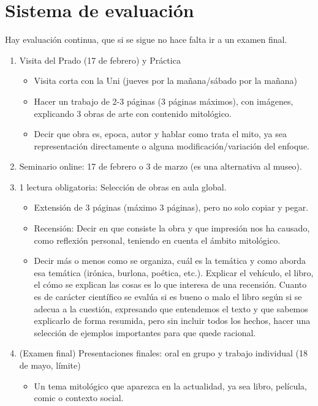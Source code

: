 \section{Sistema de evaluación}\label{sec:sistema-de-evaluación}
Hay evaluación continua, que si se sigue no hace falta ir a un examen final.
\begin{enumerate}
	\item Visita del Prado (17 de febrero) y Práctica
	      \begin{itemize}
		      \item Visita corta con la Uni (jueves por la mañana/sábado por la mañana)
		      \item Hacer un trabajo de 2-3 páginas (3 páginas máximos), con imágenes, explicando 3 obras de arte con contenido mitológico.
		      \item Decir que obra es, epoca, autor y hablar como trata el mito, ya sea representación directamente o alguna modificación/variación del enfoque.
	      \end{itemize}
	\item Seminario online: 17 de febrero o 3 de marzo (es una alternativa al museo).
	\item 1 lectura obligatoria: Selección de obras en aula global.
	      \begin{itemize}
		      \item Extensión de 3 páginas (máximo 3 páginas), pero no solo copiar y pegar.
		      \item Recensión: Decir en que consiste la obra y que impresión nos ha causado, como reflexión personal, teniendo en cuenta el ámbito mitológico.
		      \item Decir más o menos como se organiza, cuál es la temática y como aborda esa temática (irónica, burlona, poética, etc.). Explicar el vehículo, el libro, el cómo se explican las cosas es lo que interesa de una recensión. Cuanto es de carácter científico se evalúa si es bueno o malo el libro según si se adecua a la cuestión, expresando que entendemos el texto y que sabemos explicarlo de forma resumida, pero sin incluir todos los hechos, hacer una selección de ejemplos importantes para que quede racional.
	      \end{itemize}
	\item (Examen final) Presentaciones finales: oral en grupo y trabajo individual (18 de mayo, límite)
	      \begin{itemize}
		      \item Un tema mitológico que aparezca en la actualidad, ya sea libro, película, comic o contexto social.

\end{itemize}
\end{enumerate}
